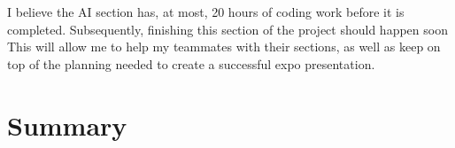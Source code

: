 \documentclass[draftclsnofoot,onecolumn,letterpaper,10pt]{IEEEtran}
\begin{document}
I believe the AI section has, at most, 20 hours of coding work before it is completed.
Subsequently, finishing this section of the project should happen soon
This will allow me to help my teammates with their sections, as well as keep on top of the planning needed to create a successful expo presentation.


\section{Summary}
\end{document}
